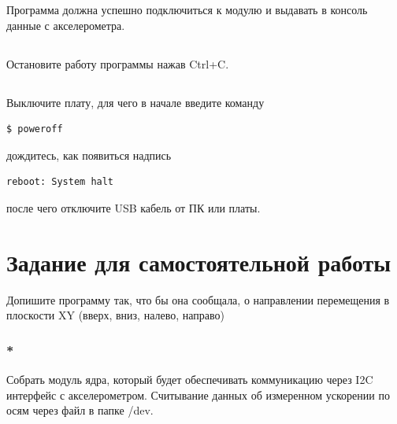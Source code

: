 Программа должна успешно подключиться к модулю и выдавать в консоль данные с акселерометра.

\subsection{} Остановите работу программы нажав Ctrl+C.

\subsection{} Выключите плату, для чего в начале введите команду
\begin{lstlisting}[style=bash]
	$ poweroff
\end{lstlisting}
дождитесь, как появиться надпись
\begin{lstlisting}[style=stdout]
	reboot: System halt
\end{lstlisting}
после чего отключите USB кабель от ПК или платы. 

\section{Задание для самостоятельной работы}

Допишите программу так, что бы она сообщала, о направлении перемещения в плоскости XY (вверх, вниз, налево, направо)

\subsubsection{*} Собрать модуль ядра, который будет обеспечивать коммуникацию через I2C интерфейс с акселерометром. Считывание данных об измеренном ускорении по осям через файл в папке /dev.